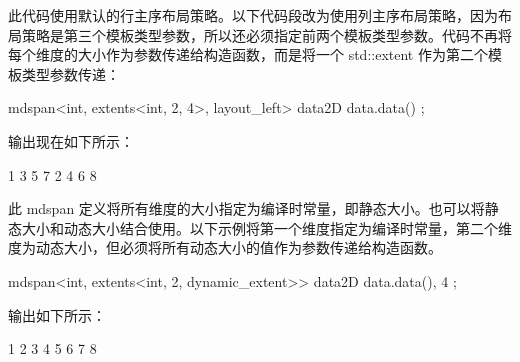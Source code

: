 此代码使用默认的行主序布局策略。以下代码段改为使用列主序布局策略，因为布局策略是第三个模板类型参数，所以还必须指定前两个模板类型参数。代码不再将每个维度的大小作为参数传递给构造函数，而是将一个 std::extent 作为第二个模板类型参数传递：

\begin{cpp}
mdspan<int, extents<int, 2, 4>, layout_left> data2D { data.data() };
\end{cpp}

输出现在如下所示：

\begin{shell}
1 3 5 7
2 4 6 8
\end{shell}

此 mdspan 定义将所有维度的大小指定为编译时常量，即静态大小。也可以将静态大小和动态大小结合使用。以下示例将第一个维度指定为编译时常量，第二个维度为动态大小，但必须将所有动态大小的值作为参数传递给构造函数。

\begin{cpp}
mdspan<int, extents<int, 2, dynamic_extent>> data2D { data.data(), 4 };
\end{cpp}

输出如下所示：

\begin{shell}
1 2 3 4
5 6 7 8
\end{shell}













